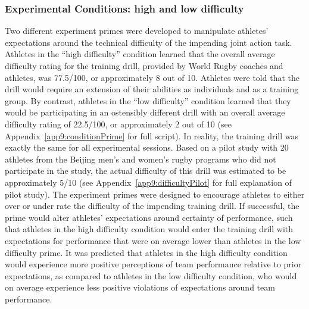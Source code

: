 \begin{CJK}{UTF8}{gbsn}


\subsubsection{Experimental Conditions: high and low difficulty\label{sect:expPrimes}}
Two different experiment primes were developed   to manipulate athletes' expectations around the technical difficulty of the impending joint action task.  Athletes in the ``high difficulty'' condition learned that the overall average difficulty rating for the training drill, provided by World Rugby coaches and athletes, was 77.5/100, or approximately 8 out of 10.  Athletes were told that the drill would require an extension of their abilities as individuals and as a training group.  By contrast, athletes in the ``low difficulty'' condition learned that they would be participating in an ostensibly different drill with an overall average difficulty rating of 22.5/100, or approximately 2 out of 10 (see Appendix~\ref{app9:conditionPrime} for full script).  In reality, the training drill was exactly the same for all experimental sessions.  Based on a pilot study with 20 athletes from the Beijing men's and women's rugby programs who did not participate in the study, the actual difficulty of this drill was estimated to be approximately 5/10 (see Appendix~\ref{app9:difficultyPilot} for full explanation of pilot study).  The experiment primes were designed to encourage athletes to either over or under rate the difficulty of the impending training drill. If successful, the prime would alter athletes' expectations around certainty of performance, such that athletes in the high difficulty condition would enter the training drill with expectations for performance that were on average lower than athletes in the low difficulty prime. It was predicted that athletes in the high difficulty condition would experience more positive perceptions of team performance relative to prior expectations, as compared to athletes in the low difficulty condition, who would on average experience less positive violations of expectations around team performance.



\end{CJK}
